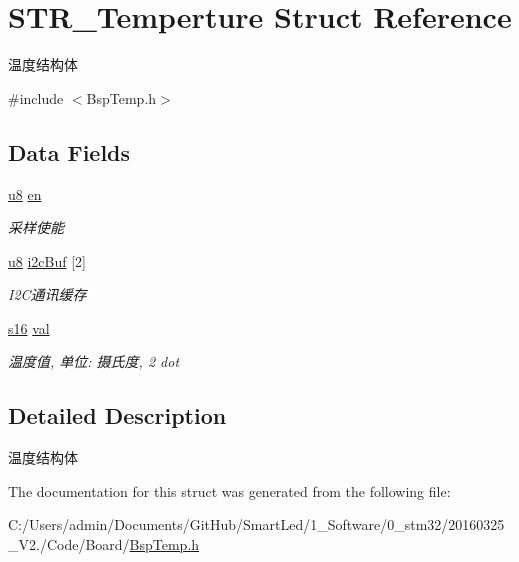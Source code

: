\hypertarget{struct_s_t_r___temperture}{\section{\-S\-T\-R\-\_\-\-Temperture \-Struct \-Reference}
\label{struct_s_t_r___temperture}
}


温度结构体  




{\ttfamily \#include $<$\-Bsp\-Temp.\-h$>$}

\subsection*{\-Data \-Fields}
\begin{DoxyCompactItemize}
\item 
\hypertarget{struct_s_t_r___temperture_a543c992269af2f3a9483997edec0658b}{\hyperlink{group___b_s_p_gaed742c436da53c1080638ce6ef7d13de}{u8} \hyperlink{struct_s_t_r___temperture_a543c992269af2f3a9483997edec0658b}{en}}\label{struct_s_t_r___temperture_a543c992269af2f3a9483997edec0658b}

\begin{DoxyCompactList}\small\item\em 采样使能 \end{DoxyCompactList}\item 
\hypertarget{struct_s_t_r___temperture_a49e1cc48894efd47131ead2498de1022}{\hyperlink{group___b_s_p_gaed742c436da53c1080638ce6ef7d13de}{u8} \hyperlink{struct_s_t_r___temperture_a49e1cc48894efd47131ead2498de1022}{i2c\-Buf} \mbox{[}2\mbox{]}}\label{struct_s_t_r___temperture_a49e1cc48894efd47131ead2498de1022}

\begin{DoxyCompactList}\small\item\em \-I2\-C通讯缓存 \end{DoxyCompactList}\item 
\hypertarget{struct_s_t_r___temperture_ac6713636039f345915aca851420e5aa5}{\hyperlink{group___b_s_p_ga5ffa4f640862b25ba6d4f635b78bdbe1}{s16} \hyperlink{struct_s_t_r___temperture_ac6713636039f345915aca851420e5aa5}{val}}\label{struct_s_t_r___temperture_ac6713636039f345915aca851420e5aa5}

\begin{DoxyCompactList}\small\item\em 温度值, 单位\-: 摄氏度, 2 dot \end{DoxyCompactList}\end{DoxyCompactItemize}


\subsection{\-Detailed \-Description}
温度结构体 

\-The documentation for this struct was generated from the following file\-:\begin{DoxyCompactItemize}
\item 
\-C\-:/\-Users/admin/\-Documents/\-Git\-Hub/\-Smart\-Led/1\-\_\-\-Software/0\-\_\-stm32/20160325\-\_\-\-V2./\-Code/\-Board/\hyperlink{_bsp_temp_8h}{\-Bsp\-Temp.\-h}\end{DoxyCompactItemize}
